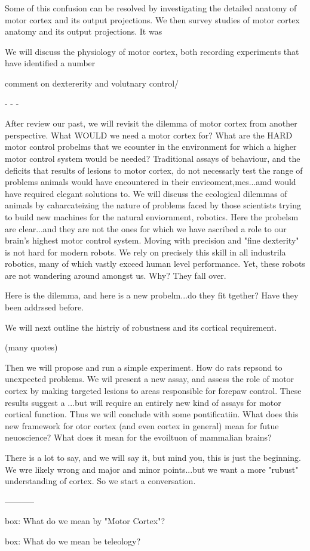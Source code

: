 Some of this confusion can be resolved by investigating the detailed anatomy of motor cortex and its output projections.
We then survey studies of motor cortex anatomy and its output projections. It was 


We will discuss the physiology of motor cortex, both recording experiments that have identified a number


comment on dextererity and volutnary control/


- - - 

After review our past, we will revisit the dilemma of motor cortex from another perspective. What WOULD we need a motor cortex for? What are the HARD motor control probelms that we ecounter in the environment for which a higher motor control system would be needed? Traditional assays of behaviour, and the deficits that results of lesions to motor cortex, do not necessarly test the range of problems animals would have encountered in their envieoment,mes...amd would have required elegant solutions to. We will discuss the ecological dilemmas of animals by caharcateizing the nature of problems faced by those scientists trying to build new machines for the natural enviornment, robotics. Here the probelsm are clear...and they are not the ones for which we have ascribed a role to our brain's highest motor control system. Moving with precision and "fine dexterity" is not hard for modern robots. We rely on precisely this skill in all industrila robotics, many of which vastly exceed human level performance. Yet, these robots are not wandering around amongst us. Why? They fall over.

Here is the dilemma, and here is a new probelm...do they fit tgether? Have they been addrssed before. 

We will next outline the histriy of robustness and its cortical requirement. 

(many quotes)

Then we will propose and run a simple experiment. How do rats repsond to unexpected problems. We wil present a new assay, and assess the role of motor cortex by making targeted lesions to areas responsible for forepaw control. These results suggest a ...but will require an entirely new kind of assays for motor cortical function. Thus we will conclude with some pontificatiin. What does this new framework for otor cortex (and even cortex in general) mean for futue neuoscience? What does it mean for the evoiltuon of mammalian brains?

There is a lot to say, and we will say it, but mind you, this is just the beginning. We wre likely wrong and major and minor points...but we want a more "rubust" understanding of cortex. So we start a conversation.

-----------

box: What do we mean by "Motor Cortex"?



box: What do we mean be teleology?

